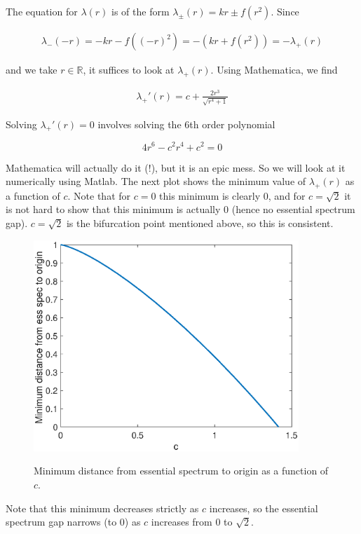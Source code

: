 \documentclass[12pt]{article}
\def\R{{\mathbb R}}
\begin{document}
The equation for $\lambda(r)$ is of the form $\lambda_\pm(r) = k r \pm f(r^2)$. Since

\begin{align*}
\lambda_-(-r) = -kr - f((-r)^2) = -(kr + f(r^2)) = -\lambda_+(r)
\end{align*} 

and we take $r \in \R$, it suffices to look at $\lambda_+(r)$. Using Mathematica, we find

\begin{align*}
\lambda_+'(r) = c+\frac{2 r^3}{\sqrt{r^4+1}}
\end{align*}

Solving $\lambda_+'(r) = 0$ involves solving the 6th order polynomial

\[
4 r^6 - c^2 r^4 + c^2 = 0
\]

Mathematica will actually do it (!), but it is an epic mess. So we will look at it numerically using Matlab. The next plot shows the minimum value of $\lambda_+(r)$ as a function of $c$. Note that for $c = 0$ this minimum is clearly $0$, and for $c = \sqrt{2}$ it is not hard to show that this minimum is actually 0 (hence no essential spectrum gap). $c = \sqrt{2}$ is the bifurcation point mentioned above, so this is consistent.

\begin{figure}[H]
\centering
\includegraphics[width=10cm]{minlambdaplus.eps}
\label{fig:essspec2}
\caption{Minimum distance from essential spectrum to origin as a function of $c$.}
\end{figure}

Note that this minimum decreases strictly as $c$ increases, so the essential spectrum gap narrows (to 0) as $c$ increases from 0 to $\sqrt{2}$.\\
\end{document}
